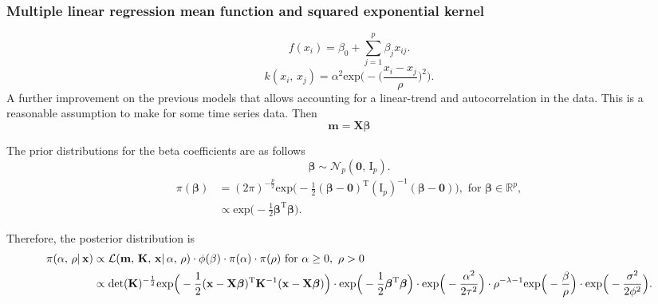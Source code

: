       \subsubsection{Multiple linear regression mean function and squared exponential kernel}

         \[f(x_{i}) = \beta_{0} + \sum_{j=1}^{p} \beta_{j} x_{ij}.\]
         \[k(x_{i},\, x_{j}) = \alpha^{2} \text{exp} \bigg(- \Big(\frac{x_i - x_j}{\rho} \Big)^2 \bigg).\]
         A further improvement on the previous models that allows accounting for a linear-trend and autocorrelation in the data. This is a reasonable assumption to make for some time series data.
         Then \[\mathbf{m} = \mathbf{X}\boldsymbol{\beta}\]

         The prior distributions for the beta coefficients are as follows
         \[\boldsymbol{\beta} \sim \mathcal{N}_{p}(\mathbf{0},\, \text{I}_{p}).\]
         \begin{align*}
            \pi(\boldsymbol{\beta}) 
            & = (2\pi)^{-\frac{p}{2}} \text{exp} \Big( -\frac{1}{2} (\boldsymbol{\beta} - \mathbf{0})^{\text{T}} (\text{I}_{p})^{-1}(\boldsymbol{\beta} - \mathbf{0}) \Big), \text{ for } \boldsymbol{\beta} \in \mathbb{R}^{p},\\
            & \propto \text{exp} \Big( -\frac{1}{2} \boldsymbol{\beta}^{\text{T}} \boldsymbol{\beta} \Big).
         \end{align*}

         Therefore, the posterior distribution is
         \begin{align*}
            \pi(\alpha,\, \rho| \, \mathbf{x}) 
            & \propto \mathcal{L}(\mathbf{m},\, \mathbf{K},\, \mathbf{x}| \, \alpha,\, \rho) 
            \cdot \phi(\beta)
            \cdot \pi(\alpha) 
            \cdot \pi(\rho) 
            \text{ for } \alpha \geq 0,\ \rho > 0\\
            & \propto \text{det}(\mathbf{K})^{-\frac{1}{2}} 
            \text{exp} \Big(-\frac{1}{2} (\mathbf{x} - \mathbf{X}\boldsymbol{\beta})^{\text{\text{T}}} \mathbf{K}^{-1} (\mathbf{x} - \mathbf{X}\boldsymbol{\beta}) \Big)
            \cdot \text{exp} \Big( -\frac{1}{2} \boldsymbol{\beta}^{\text{T}} \boldsymbol{\beta} \Big)
            \cdot \text{exp} \Big(-\frac{\alpha^2}{2\tau^2} \Big) 
            \cdot \rho^{-\lambda-1} \text{exp} \Big(-\frac{\beta}{\rho} \Big) 
            \cdot \text{exp} \Big(-\frac{\sigma^2}{2\phi^2} \Big).
         \end{align*}

